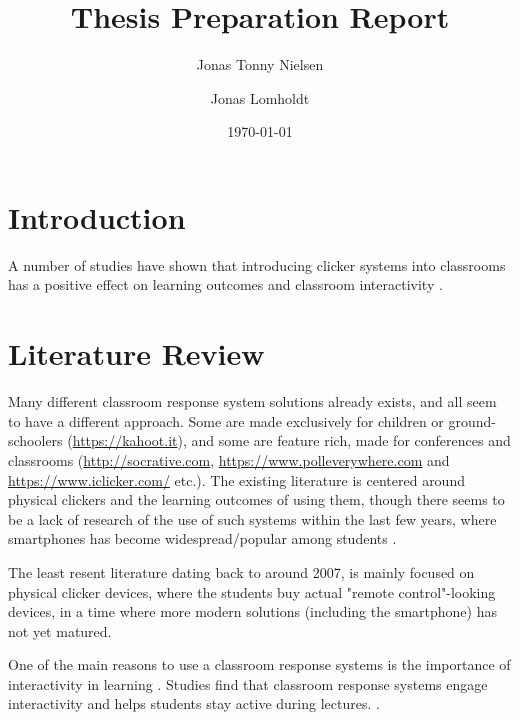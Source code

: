 \documentclass{article}
\title{Thesis Preparation Report}
\author{Jonas Tonny Nielsen \and Jonas Lomholdt}
\date{\today}
\begin{document}
\maketitle

\listoftodos

\tableofcontents


\section{Introduction} %
A number of studies have shown that introducing clicker systems into classrooms has a positive effect on learning outcomes and classroom interactivity \cite{yourstone2008classroom, siau2006use, lantz2014effectiveness}. 




\section{Literature Review} %
Many different classroom response system solutions already exists, and all seem to have a different approach. Some are made exclusively for children or ground-schoolers (\url{https://kahoot.it}), and some are feature rich, made for conferences and classrooms (\url{http://socrative.com},  \url{https://www.polleverywhere.com} and \url{https://www.iclicker.com/} etc.). The existing literature is centered around physical clickers and the learning outcomes of using them, though there seems to be a lack of research of the use of such systems within the last few years, where smartphones has become widespread/popular among students \cite[p.~1]{stowell2015use}. 

The least resent literature dating back to around 2007, is mainly focused on physical clicker devices, where the students buy actual "remote control"-looking devices, in a time where more modern solutions (including the smartphone) has not yet matured.





One of the main reasons to use a classroom response systems is the importance of interactivity in learning \cite{draper2004increasing}. 
Studies find that classroom response systems engage interactivity and helps students stay active during lectures. \cite[p.~116]{moredich2007engaging, }.
\end{document}
